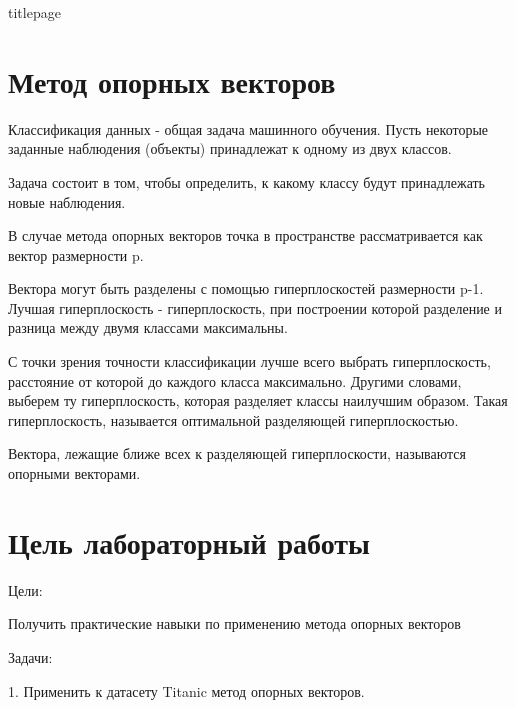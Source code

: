 \documentclass[a4paper,12pt]{article}
\begin{document}
\begin{titlepage}
\newpage

{titlepage}
\end{titlepage}

\newpage
\tableofcontents
\setcounter{page}{2}



\newpage\section{Метод опорных векторов} 
	Классификация данных - общая задача машинного обучения. Пусть некоторые заданные наблюдения (объекты) принадлежат к одному из двух классов. 

	\vspace{0.5cm}
	Задача состоит в том, чтобы определить, к какому классу будут принадлежать новые наблюдения. 

	\vspace{0.5cm}
	В случае метода опорных векторов точка в пространстве рассматривается как вектор размерности p. 

	\vspace{0.5cm}
	Вектора могут быть разделены с помощью гиперплоскостей размерности p-1. Лучшая гиперплоскость - гиперплоскость, при построении которой разделение и разница между двумя классами максимальны. 
	
	\vspace{0.5cm}
	С точки зрения точности классификации лучше всего выбрать гиперплоскость, расстояние от которой до каждого класса максимально. Другими словами, выберем ту гиперплоскость, которая разделяет классы наилучшим образом. Такая гиперплоскость, называется оптимальной разделяющей гиперплоскостью.
	
	\vspace{0.5cm}
	Вектора, лежащие ближе всех к разделяющей гиперплоскости, называются опорными векторами.
	
	
	
\newpage\section{Цель лабораторный работы} 
	Цели: 
	\vspace{0.1cm}
	
	Получить практические навыки по применению метода опорных векторов
	
	\vspace{0.1cm}
	Задачи: 
	
	\vspace{0.1cm}
	1. Применить к датасету Titanic метод опорных векторов.
	
\end{document}
